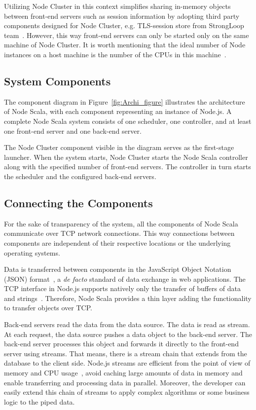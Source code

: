 \documentclass[10pt,conference,letterpaper]{IEEEtran}
\begin{document}
Utilizing Node Cluster in this context simplifies sharing in-memory objects 
between front-end servers such as session information by adopting third 
party components designed for Node Cluster, e.g. TLS-session store from StrongLoop team~\cite{StLo02}. However, this way front-end servers can only 
be started only on the same machine of Node Cluster. It is worth mentioning 
that the ideal number of Node instances on a host machine is the number of 
the CPUs in this machine~\cite{Syed:2014:BN:2723784}.

\subsection{System Components}

The component diagram in Figure~\ref{fig:Archi_figure} illustrates the
architecture of Node Scala, with each component representing an
instance of Node.js. A complete Node Scala system consists of one
scheduler, one controller, and at least one front-end server and one
back-end server.

The Node Cluster component visible in the diagram serves as the
first-stage launcher. When the system starts, Node Cluster starts the
Node Scala controller along with the specified number of front-end
servers.  The controller in turn starts the scheduler and the
configured back-end servers.

\subsection{Connecting the Components}

For the sake of transparency of the system, all the components of Node
Scala communicate over TCP network connections. This way connections
between components are independent of their respective locations or
the underlying operating systems.

Data is transferred between components in the JavaScript Object 
Notation (JSON) format~\cite{JSON}, a \textit{de facto} standard of 
data exchange in web applications. The TCP interface in Node.js supports natively
only the transfer of buffers of data and strings~\cite{Node02}. Therefore, 
Node Scala provides a thin layer adding the functionality to transfer objects over TCP.

Back-end servers read the data from the data source. The data is read
as stream. At each request, the data source pushes a data object to
the back-end server. The back-end server processes this object and
forwards it directly to the front-end server using streams. That
means, there is a stream chain that extends from the database to the
client side. Node.js streams are efficient from the point of view of
memory and CPU usage~\cite{Syed:2014:BN:2723784}, avoid caching large
amounts of data in memory and enable transferring and processing data
in parallel. Moreover, the developer can easily extend this chain of
streams to apply complex algorithms or some business logic to the
piped data.
\end{document}
